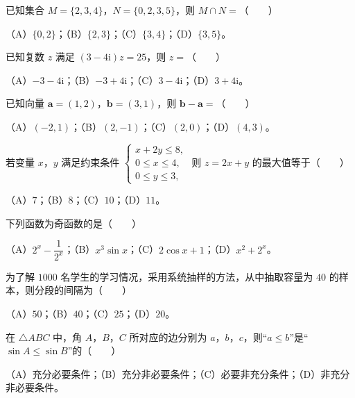 \begin{question}
已知集合 $M=\{2,3,4\}$，$N=\{0,2,3,5\}$，则 $M\cap N=$\mbox{（　　）}

（A）$\{0,2\}$；（B）$\{2,3\}$；（C）$\{3,4\}$；（D）$\{3,5\}$。

\end{question}
\begin{question}
已知复数 $z$ 满足 $(3-4\mathrm i)z=25$，则 $z=$\mbox{（　　）}

（A）$-3-4\mathrm i$；（B）$-3+4\mathrm i$；（C）$3-4\mathrm i$；（D）$3+4\mathrm i$。

\end{question}
\begin{question}
已知向量 $\boldsymbol a=(1,2)$，$\boldsymbol b=(3,1)$，则 $\boldsymbol b-\boldsymbol a=$\mbox{（　　）}

（A）$(-2,1)$；（B）$(2,-1)$；（C）$(2,0)$；（D）$(4,3)$。

\end{question}
\begin{question}
若变量 $x$，$y$ 满足约束条件 $\begin{cases}x+2y\leqslant 8,\\0\leqslant x\leqslant 4,\\0\leqslant y\leqslant 3,\end{cases}$ 则 $z=2x+y$ 的最大值等于\mbox{（　　）}

（A）$7$；（B）$8$；（C）$10$；（D）$11$。

\end{question}
\begin{question}
下列函数为奇函数的是\mbox{（　　）}

（A）$2^x-\dfrac1{2^x}$；（B）$x^3\sin x$；（C）$2\cos x+1$；（D）$x^2+2^x$。

\end{question}
\begin{question}
为了解 $1000$ 名学生的学习情况，采用系统抽样的方法，从中抽取容量为 $40$ 的样本，则分段的间隔为\mbox{（　　）}

（A）$50$；（B）$40$；（C）$25$；（D）$20$。

\end{question}
\begin{question}
在 $\triangle ABC$ 中，角 $A$，$B$，$C$ 所对应的边分别为 $a$，$b$，$c$，则“$a\leqslant b$”是“$\sin A\leqslant\sin B$”的\mbox{（　　）}

（A）充分必要条件；（B）充分非必要条件；（C）必要非充分条件；（D）非充分非必要条件。

\end{question}

